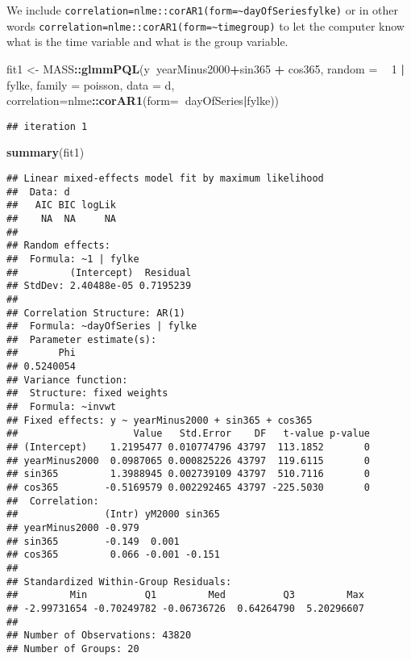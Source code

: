 \documentclass[]{book}
\newenvironment{Shaded}{\begin{snugshade}}{\end{snugshade}}
\newcommand{\KeywordTok}[1]{\textcolor[rgb]{0.13,0.29,0.53}{\textbf{#1}}}
\newcommand{\DataTypeTok}[1]{\textcolor[rgb]{0.13,0.29,0.53}{#1}}
\newcommand{\DecValTok}[1]{\textcolor[rgb]{0.00,0.00,0.81}{#1}}
\newcommand{\StringTok}[1]{\textcolor[rgb]{0.31,0.60,0.02}{#1}}
\newcommand{\OperatorTok}[1]{\textcolor[rgb]{0.81,0.36,0.00}{\textbf{#1}}}
\newcommand{\NormalTok}[1]{#1}
\begin{document}
We include
\texttt{correlation=nlme::corAR1(form=\textasciitilde{}dayOfSeries\textbar{}fylke)}
or in other words
\texttt{correlation=nlme::corAR1(form=\textasciitilde{}time\textbar{}group)}
to let the computer know what is the time variable and what is the group
variable.

\begin{Shaded}
\begin{Highlighting}[]
\NormalTok{fit1 <-}\StringTok{ }\NormalTok{MASS}\OperatorTok{::}\KeywordTok{glmmPQL}\NormalTok{(y}\OperatorTok{~}\NormalTok{yearMinus2000}\OperatorTok{+}\NormalTok{sin365 }\OperatorTok{+}\StringTok{ }\NormalTok{cos365, }\DataTypeTok{random =} \OperatorTok{~}\StringTok{ }\DecValTok{1} \OperatorTok{|}\StringTok{ }\NormalTok{fylke,}
                \DataTypeTok{family =}\NormalTok{ poisson, }\DataTypeTok{data =}\NormalTok{ d,}
                \DataTypeTok{correlation=}\NormalTok{nlme}\OperatorTok{::}\KeywordTok{corAR1}\NormalTok{(}\DataTypeTok{form=}\OperatorTok{~}\NormalTok{dayOfSeries}\OperatorTok{|}\NormalTok{fylke))}
\end{Highlighting}
\end{Shaded}

\begin{verbatim}
## iteration 1
\end{verbatim}

\begin{Shaded}
\begin{Highlighting}[]
\KeywordTok{summary}\NormalTok{(fit1)}
\end{Highlighting}
\end{Shaded}

\begin{verbatim}
## Linear mixed-effects model fit by maximum likelihood
##  Data: d 
##   AIC BIC logLik
##    NA  NA     NA
## 
## Random effects:
##  Formula: ~1 | fylke
##         (Intercept)  Residual
## StdDev: 2.40488e-05 0.7195239
## 
## Correlation Structure: AR(1)
##  Formula: ~dayOfSeries | fylke 
##  Parameter estimate(s):
##       Phi 
## 0.5240054 
## Variance function:
##  Structure: fixed weights
##  Formula: ~invwt 
## Fixed effects: y ~ yearMinus2000 + sin365 + cos365 
##                    Value   Std.Error    DF   t-value p-value
## (Intercept)    1.2195477 0.010774796 43797  113.1852       0
## yearMinus2000  0.0987065 0.000825226 43797  119.6115       0
## sin365         1.3988945 0.002739109 43797  510.7116       0
## cos365        -0.5169579 0.002292465 43797 -225.5030       0
##  Correlation: 
##               (Intr) yM2000 sin365
## yearMinus2000 -0.979              
## sin365        -0.149  0.001       
## cos365         0.066 -0.001 -0.151
## 
## Standardized Within-Group Residuals:
##         Min          Q1         Med          Q3         Max 
## -2.99731654 -0.70249782 -0.06736726  0.64264790  5.20296607 
## 
## Number of Observations: 43820
## Number of Groups: 20
\end{verbatim}
\end{document}
